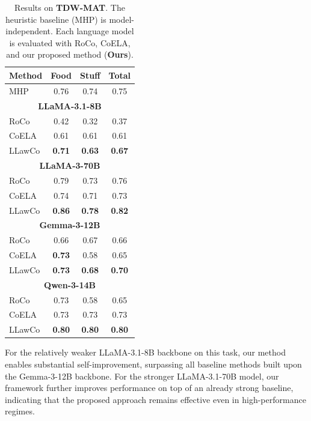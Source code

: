 \documentclass{article}
\theoremstyle{plain}
\theoremstyle{definition}
\theoremstyle{remark}
\newcommand{\name}{LLawCo\xspace}
\begin{document}
\begin{table}[t]
\centering
\setlength{\tabcolsep}{5pt}
\caption{Results on \textbf{TDW-MAT}. The heuristic baseline (\textsc{MHP}) is model-independent. Each language model is evaluated with RoCo, CoELA, and our proposed method (\textbf{Ours}).}
\label{tab:tdw-mat}
\begin{tabular}{l|ccc}
\toprule
\textbf{Method} & \textbf{Food} & \textbf{Stuff} & \textbf{Total} \\
\midrule
\textsc{MHP} & 0.76 & 0.74 & 0.75 \\

\midrule
\multicolumn{4}{c}{\textbf{LLaMA-3.1-8B}} \\
RoCo  & 0.42 & 0.32 & 0.37 \\
CoELA & 0.61 & 0.61 & 0.61 \\
\name  & \textbf{0.71} & \textbf{0.63} & \textbf{0.67} \\

\midrule
\multicolumn{4}{c}{\textbf{LLaMA-3-70B}} \\
RoCo  & 0.79 & 0.73 & 0.76 \\
CoELA & 0.74 & 0.71 & 0.73 \\
\name  & \textbf{0.86} & \textbf{0.78} & \textbf{0.82} \\

\midrule
\multicolumn{4}{c}{\textbf{Gemma-3-12B}} \\
RoCo  & 0.66 & 0.67 & 0.66 \\
CoELA & \textbf{0.73} & 0.58 & 0.65 \\
\name  & \textbf{0.73} & \textbf{0.68} & \textbf{0.70} \\

\midrule
\multicolumn{4}{c}{\textbf{Qwen-3-14B}} \\
RoCo  & 0.73 & 0.58 & 0.65 \\
CoELA & 0.73 & 0.73 & 0.73 \\
\name  & \textbf{0.80} & \textbf{0.80} & \textbf{0.80} \\

\bottomrule
\end{tabular}
\end{table}

For the relatively weaker LLaMA-3.1-8B backbone on this task, our method enables substantial self-improvement, surpassing all baseline methods built upon the Gemma-3-12B backbone. For the stronger LLaMA-3.1-70B model, our framework further improves performance on top of an already strong baseline, indicating that the proposed approach remains effective even in high-performance regimes.
\end{document}

